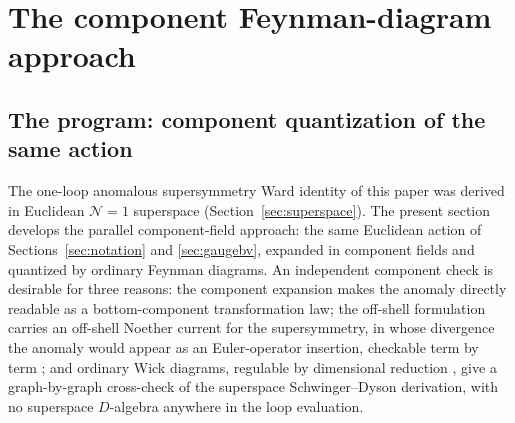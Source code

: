 \section{The component Feynman-diagram approach}\label{sec:component}

\subsection{The program: component quantization of the same action}%
\label{sec:component:program}

The one-loop anomalous supersymmetry Ward identity of this paper was derived in
Euclidean $\mathcal N=1$ superspace (Section~\ref{sec:superspace}). The present
section develops the parallel component-field approach: the same Euclidean
action of Sections~\ref{sec:notation} and \ref{sec:gaugebv}, expanded in
component fields and quantized by ordinary Feynman diagrams. An independent
component check is desirable for three reasons: the component expansion makes
the anomaly directly readable as a bottom-component transformation law; the
off-shell formulation carries an off-shell Noether current for the
supersymmetry, in whose divergence the anomaly would appear as an
Euler-operator insertion, checkable term by term \cite{WeinbergIII,GGRS}; and
ordinary Wick diagrams, regulable by dimensional reduction \cite{SiegelDRED},
give a graph-by-graph cross-check of the superspace Schwinger--Dyson
derivation, with no superspace $D$-algebra anywhere in the loop evaluation.

